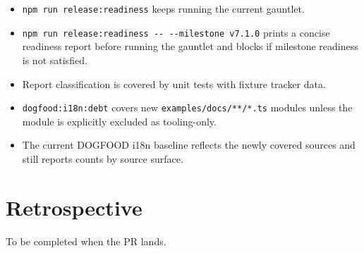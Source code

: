 \begin{itemize}
\tightlist
\item
  \texttt{n\allowbreak{}p\allowbreak{}m\allowbreak{} \allowbreak{}r\allowbreak{}u\allowbreak{}n\allowbreak{} \allowbreak{}r\allowbreak{}e\allowbreak{}l\allowbreak{}e\allowbreak{}a\allowbreak{}s\allowbreak{}e\allowbreak{}:\allowbreak{}r\allowbreak{}e\allowbreak{}a\allowbreak{}d\allowbreak{}i\allowbreak{}n\allowbreak{}e\allowbreak{}s\allowbreak{}s} keeps running the current gauntlet.
\item
  \texttt{n\allowbreak{}p\allowbreak{}m\allowbreak{} \allowbreak{}r\allowbreak{}u\allowbreak{}n\allowbreak{} \allowbreak{}r\allowbreak{}e\allowbreak{}l\allowbreak{}e\allowbreak{}a\allowbreak{}s\allowbreak{}e\allowbreak{}:\allowbreak{}r\allowbreak{}e\allowbreak{}a\allowbreak{}d\allowbreak{}i\allowbreak{}n\allowbreak{}e\allowbreak{}s\allowbreak{}s\allowbreak{} \allowbreak{}-\allowbreak{}-\allowbreak{} \allowbreak{}-\allowbreak{}-\allowbreak{}m\allowbreak{}i\allowbreak{}l\allowbreak{}e\allowbreak{}s\allowbreak{}t\allowbreak{}o\allowbreak{}n\allowbreak{}e\allowbreak{} \allowbreak{}v\allowbreak{}7\allowbreak{}.\allowbreak{}1\allowbreak{}.\allowbreak{}0} prints a concise readiness report before running the gauntlet and blocks if milestone readiness is not satisfied.
\item
  Report classification is covered by unit tests with fixture tracker data.
\item
  \texttt{d\allowbreak{}o\allowbreak{}g\allowbreak{}f\allowbreak{}o\allowbreak{}o\allowbreak{}d\allowbreak{}:\allowbreak{}i\allowbreak{}1\allowbreak{}8\allowbreak{}n\allowbreak{}:\allowbreak{}d\allowbreak{}e\allowbreak{}b\allowbreak{}t} covers new \texttt{e\allowbreak{}x\allowbreak{}a\allowbreak{}m\allowbreak{}p\allowbreak{}l\allowbreak{}e\allowbreak{}s\allowbreak{}/\allowbreak{}d\allowbreak{}o\allowbreak{}c\allowbreak{}s\allowbreak{}/\allowbreak{}*\allowbreak{}*\allowbreak{}/\allowbreak{}*\allowbreak{}.\allowbreak{}t\allowbreak{}s} modules unless the module is explicitly excluded as tooling-only.
\item
  The current DOGFOOD i18n baseline reflects the newly covered sources and still reports counts by source surface.
\end{itemize}

\section{Retrospective}\label{record-214-retrospective}

To be completed when the PR lands.

